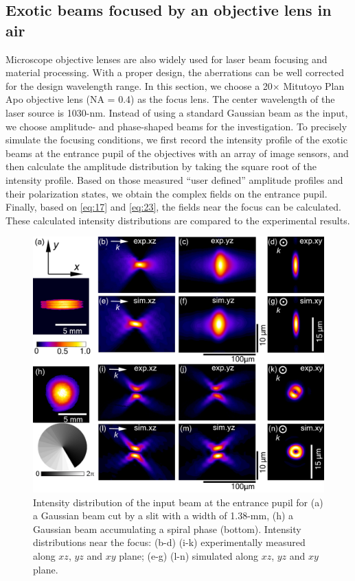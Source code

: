 \documentclass[9pt,twocolumn,twoside]{osajnl}
\begin{document}
\subsection{Exotic beams focused by an objective lens in air}
Microscope objective lenses are also widely used for laser beam focusing and material processing. With a proper design, the aberrations can be well corrected for the design wavelength range. In this section, we choose a 20$\times$ Mitutoyo Plan Apo objective lens (NA = 0.4) as the focus lens. The center wavelength of the laser source is 1030-nm. Instead of using a standard Gaussian beam as the input, we choose amplitude- and phase-shaped beams for the investigation. To precisely simulate the focusing conditions, we first record the intensity profile of the exotic beams at the entrance pupil of the objectives with an array of image sensors, and then calculate the amplitude distribution by taking the square root of the intensity profile. Based on those measured ``user defined'' amplitude profiles and their polarization states, we obtain the complex fields on the entrance pupil. Finally, based on \eqref{eq:17} and \eqref{eq:23}, the fields near the focus can be calculated. These calculated intensity distributions are compared to the experimental results. 

\begin{figure}
	\centering
	\includegraphics[width=\linewidth]{20xairExotic.pdf}
	\caption{Intensity distribution of the input beam at the entrance pupil for (a) a Gaussian beam cut by a slit with a width of 1.38-mm, (h) a Gaussian beam accumulating a spiral phase (bottom). Intensity distributions near the focus: (b-d) (i-k) experimentally measured along $xz$, $yz$ and $xy$ plane; (e-g) (l-n) simulated along $xz$, $yz$ and $xy$ plane.}\label{fig:4}
\end{figure}
\end{document}
